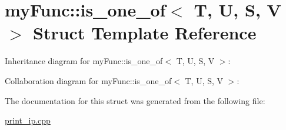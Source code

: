 \hypertarget{structmyFunc_1_1is__one__of}{}\section{my\+Func\+:\+:is\+\_\+one\+\_\+of$<$ T, U, S, V $>$ Struct Template Reference}
\label{structmyFunc_1_1is__one__of}


Inheritance diagram for my\+Func\+:\+:is\+\_\+one\+\_\+of$<$ T, U, S, V $>$\+:


Collaboration diagram for my\+Func\+:\+:is\+\_\+one\+\_\+of$<$ T, U, S, V $>$\+:


The documentation for this struct was generated from the following file\+:\begin{DoxyCompactItemize}
\item 
\hyperlink{print__ip_8cpp}{print\+\_\+ip.\+cpp}\end{DoxyCompactItemize}
